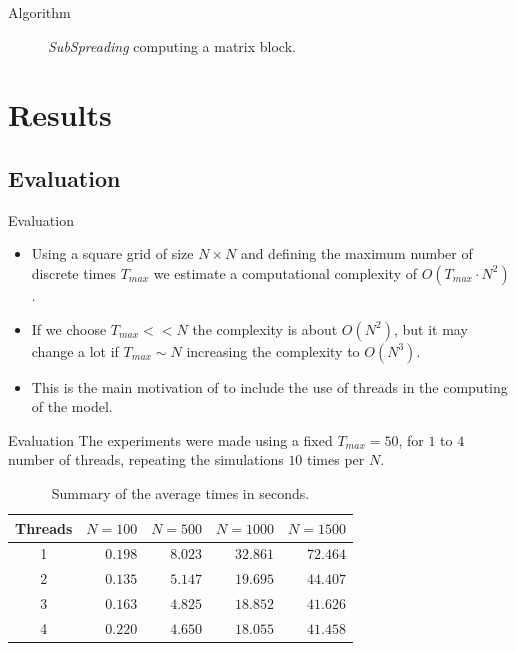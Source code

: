 \documentclass{beamer}
\begin{document}
      \begin{frame}{Algorithm}
        \begin{figure}
          \centering
          \resizebox{0.65\textwidth}{!}{
            
          }    
          \caption{\emph{SubSpreading} computing a matrix block.}
          \label{fig:thread}
        \end{figure}
      \end{frame}
      
  \section{Results}
      \subsection{Evaluation}
      
      \begin{frame}{Evaluation}
        \begin{itemize}
          \item<1-> Using a square grid of size $N \times N$ and defining the maximum number
            of discrete times $T_{max}$ we estimate a computational complexity of $O(T_{max}\cdot N^2)$. 
          \item<2-> If we choose $T_{max} << N$ the complexity is about $O(N^2)$, but it 
            may change a lot if $T_{max}\sim N$ increasing the complexity to $O(N^3)$. 
          \item<3-> This is the main  motivation of to include the use of threads in the computing of the model.
        \end{itemize} 
      \end{frame}
      
      \begin{frame}{Evaluation}
        The experiments were made using a fixed $T_{max}=50$, for $1$ to $4$ number of threads, repeating the 
        simulations $10$ times per $N$.
        \begin{table}[!ht]
          \renewcommand{\arraystretch}{1.3}
          \centering
          \caption{Summary of the average times in seconds.}
          \label{tab:results}
          \begin{tabular}{c||rrrr}
            \hline
            Threads & $N=100$ & $N=500$ & $N=1000$ & $N=1500$ \\ \hline\hline
            1       & $0.198$   & $8.023$   & $32.861$   & $72.464$   \\
            2       & $0.135$   & $5.147$   & $19.695$   & $44.407$   \\
            3       & $0.163$   & $4.825$   & $18.852$   & $41.626$   \\
            4       & $0.220$   & $4.650$   & $18.055$   & $41.458$  
          \end{tabular}
        \end{table}
      \end{frame}
      
\end{document}
